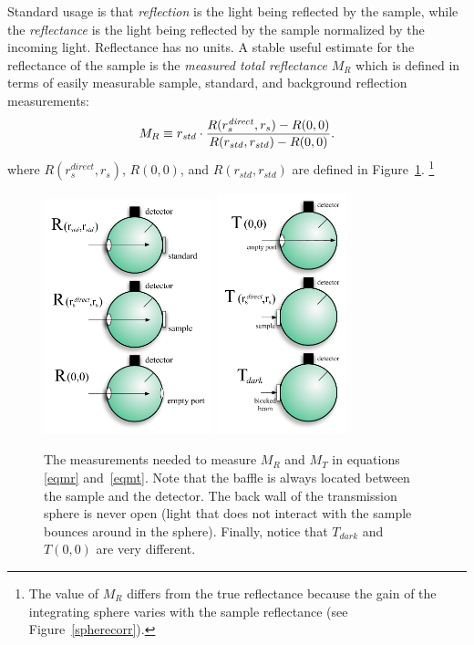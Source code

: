 \documentclass{article}
\newcommand\rdirect{r_s^{\mathit{direct}}}
\newcommand\rdiffuse{r_s}
\begin{document}
Standard usage is that \textit{reflection} is the light being reflected by the sample,
while the \textit{reflectance} is the light being reflected by the sample normalized by
the incoming light.  Reflectance has no units.  A stable useful estimate for the 
reflectance of the sample is the 
\textit{measured total reflectance} $M_R$ which is defined in terms of easily measurable
sample, standard, and background reflection measurements:
\begin{equation}
M_R \equiv r_\mathit{std}\cdot{{R(\rdirect, \rdiffuse) - R(0, 0)\over 
                    R(r_{\mathit{std}}, r_{\mathit{std}})- R(0, 0)} }.
\label{eqmr}
\end{equation}
where $R(\rdirect, \rdiffuse)$, $R(0, 0)$, and 
$R(r_\mathit{std}, r_\mathit{std})$ are defined in Figure~\ref{spherert}.%
\footnote{The value of $M_R$ differs from the true reflectance because the gain
of the integrating sphere varies with the sample reflectance (see Figure~\ref{spherecorr}).}


\begin{figure}[!b]
\centering
\includegraphics[width=49mm]{ch3spheresR.pdf}
\includegraphics[width=38mm]{ch3spheresT.pdf}
\caption{The measurements needed to measure $M_R$ and $M_T$ in equations \ref{eqmr} and~\ref{eqmt}.
Note that the baffle is always located between the sample and
the detector.  The back wall of the transmission sphere is never open
(light that does not interact with the sample bounces around in the sphere).  Finally,
notice that $T_\mathit{dark}$ and $T(0,0)$ are very different.}
\label{spherert}
\end{figure}
\end{document}
